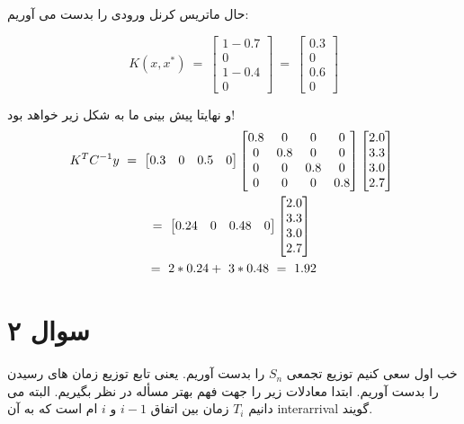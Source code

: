 \documentclass{article}[12pt]
\begin{document}
حال ماتریس کرنل ورودی را بدست می آوریم:

\begin{equation*}
K\left( x,x^{*}\right) \ =\ \begin{bmatrix}
1-0.7\\
0\\
1-0.4\\
0
\end{bmatrix} \ =\ \begin{bmatrix}
0.3\\
0\\
0.6\\
0
\end{bmatrix}
\end{equation*}

و نهایتا پیش بینی ما به شکل زیر خواهد بود!
\begin{gather}
K^{T} C^{-1} y\ =\ \begin{bmatrix}
0.3 & 0 & 0.5 & 0
\end{bmatrix}\begin{bmatrix}
0.8 & 0 & 0 & 0\\
0 & 0.8 & 0 & 0\\
0 & 0 & 0.8 & 0\\
0 & 0 & 0 & 0.8
\end{bmatrix}\begin{bmatrix}
2.0\\
3.3\\
3.0\\
2.7
\end{bmatrix} \ \\
=\ \begin{bmatrix}
0.24 & 0 & 0.48 & 0
\end{bmatrix}\begin{bmatrix}
2.0\\
3.3\\
3.0\\
2.7
\end{bmatrix} \  \notag\\
=\ 2*0.24+\ 3*0.48\ =\ 1.92 \notag
\end{gather}

\clearpage
\section{سوال ۲}


خب اول سعی کنیم توزیع تجمعی 
$S_n$
را بدست آوریم. 
یعنی تابع توزیع زمان های رسیدن را بدست آوریم. ابتدا معادلات زیر را جهت فهم بهتر مسأله در نظر بگیریم.  
البته می دانیم  
$T_i$
زمان بین اتفاق
 $i-1$ 
و 
$i$
 ام است که به آن 
 interarrival گویند. 
 
\end{document}

